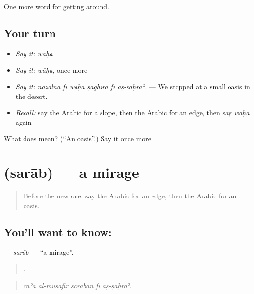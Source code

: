 \begin{grammarlens}[title={What you've built}]
One more word for getting around.
\end{grammarlens}

\subsection*{Your turn}
\begin{itemize}
\raggedright
  \item \emph{Say it:} \emph{wāḥa}
  \item \emph{Say it:} \emph{wāḥa}, once more
  \item \emph{Say it:} \emph{nazalnā fī wāḥa ṣaghīra fī aṣ-ṣaḥrāʾ.} — We stopped at a small oasis in the desert.
  \item \emph{Recall:} say the Arabic for a slope, then the Arabic for an edge, then say \emph{wāḥa} again
\end{itemize}

\begin{tcolorbox}[breakable,colback=teal!4,colframe=teal!35!black,title={Before you move on}]
What does  mean? (\textquotedblleft{}An oasis\textquotedblright{}.) Say it once more.
\end{tcolorbox}
\section[\texorpdfstring{\ar{سراب} (sarāb)}{سراب (sarāb)}]{ (sarāb) — a mirage}

\label{lesson:AR-C473-sarab}



\begin{quote}
Before the new one: say the Arabic for an edge, then the Arabic for an oasis.
\end{quote}

\subsection*{You'll want to know: }
\textbf{} — \emph{sarāb} — \textquotedblleft{}a mirage\textquotedblright{}.

\begin{quote}
    .
\end{quote}

\begin{quote}
\emph{raʾā al-musāfir sarāban fī aṣ-ṣaḥrāʾ.}
\end{quote}

